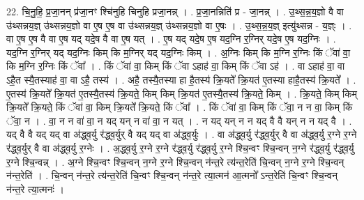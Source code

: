 \documentclass[17pt]{extarticle}
\begin{document}
22. चि॒नु॒हि॒ प्र॒जा॒नन् प्र॑जा॒नꣳ श्चि॑नुहि चिनुहि प्रजा॒नन्न् । . प्र॒जा॒नन्निति॑ प्र - जा॒नन्न् । . उ॒थ्स॒न्न॒य॒ज्ञो वै वा उ॑थ्सन्नय॒ज्ञ् उ॑थ्सन्नय॒ज्ञो वा ए॒ष ए॒ष वा उ॑थ्सन्नय॒ज्ञ् उ॑थ्सन्नय॒ज्ञो वा ए॒षः । . उ॒थ्स॒न्न॒य॒ज्ञ् इत्यु॑थ्सन्न - य॒ज्ञ्ः । . वा ए॒ष ए॒ष वै वा ए॒ष यद् यदे॒ष वै वा ए॒ष यत् । . ए॒ष यद् यदे॒ष ए॒ष यद॒ग्नि र॒ग्निर् यदे॒ष ए॒ष यद॒ग्निः । . यद॒ग्नि र॒ग्निर् यद् यद॒ग्निः किम् कि म॒ग्निर् यद् यद॒ग्निः किम् । . अ॒ग्निः किम् कि म॒ग्नि र॒ग्निः किं ॅवा॑ वा॒ कि म॒ग्नि र॒ग्निः किं ॅवा᳚ । . किं ॅवा॑ वा॒ किम् किं ॅवा ऽहाह॑ वा॒ किम् किं ॅवा ऽह॑ । . वा ऽहाह॑ वा॒ वा ऽहै॒त स्यै॒तस्याह॑ वा॒ वा ऽहै॒ तस्य॑ । . अहै॒ तस्यै॒तस्या हा है॒तस्य॑ क्रि॒यते᳚ क्रि॒यत॑ ए॒तस्या हाहै॒तस्य॑ क्रि॒यते᳚ । . ए॒तस्य॑ क्रि॒यते᳚ क्रि॒यत॑ ए॒तस्यै॒तस्य॑ क्रि॒यते॒ किम् किम् क्रि॒यत॑ ए॒तस्यै॒तस्य॑ क्रि॒यते॒ किम् । . क्रि॒यते॒ किम् किम् क्रि॒यते᳚ क्रि॒यते॒ किं ॅवा॑ वा॒ किम् क्रि॒यते᳚ क्रि॒यते॒ किं ॅवा᳚ । . किं ॅवा॑ वा॒ किम् किं ॅवा॒ न न वा॒ किम् किं ॅवा॒ न । . वा॒ न न वा॑ वा॒ न यद् यन् न वा॑ वा॒ न यत् । . न यद् यन् न न यद् वै वै यन् न न यद् वै । . यद् वै वै यद् यद् वा अ॑द्ध्व॒र्यु र॑द्ध्व॒र्युर् वै यद् यद् वा अ॑द्ध्व॒र्युः । . वा अ॑द्ध्व॒र्यु र॑द्ध्व॒र्युर् वै वा अ॑द्ध्व॒र्यु र॒ग्ने र॒ग्ने र॑द्ध्व॒र्युर् वै वा अ॑द्ध्व॒र्यु र॒ग्नेः । . अ॒द्ध्व॒र्यु र॒ग्ने र॒ग्ने र॑द्ध्व॒र्यु र॑द्ध्व॒र्यु र॒ग्ने श्चि॒न्वꣳ श्चि॒न्वन् न॒ग्ने र॑द्ध्व॒र्यु र॑द्ध्व॒र्यु र॒ग्ने श्चि॒न्वन्न् । . अ॒ग्ने श्चि॒न्वꣳ श्चि॒न्वन् न॒ग्ने र॒ग्ने श्चि॒न्वन् न॑न्त॒रे त्य॑न्त॒रेति॑ चि॒न्वन् न॒ग्ने र॒ग्ने श्चि॒न्वन् न॑न्त॒रेति॑ । . चि॒न्वन् न॑न्त॒रे त्य॑न्त॒रेति॑ चि॒न्वꣳ श्चि॒न्वन् न॑न्त॒रे त्या॒त्मन॑ आ॒त्मनो᳚ ऽन्त॒रेति॑ चि॒न्वꣳ श्चि॒न्वन् न॑न्त॒रे त्या॒त्मनः॑ । \newline
\end{document}
